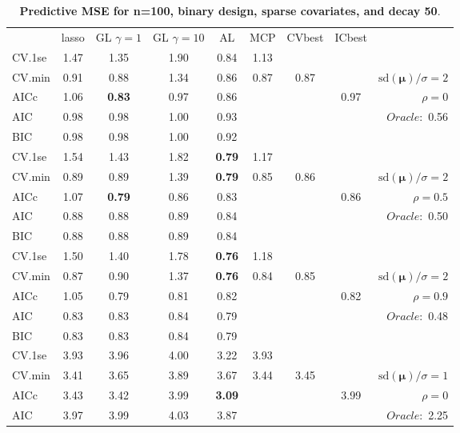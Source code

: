 \begin{table}\vspace{-.5cm}
\caption[l]{ { \bf Predictive MSE for n=100, binary design, 
sparse covariates, and  decay  50}.}
\vspace{-.5cm}
\footnotesize{}
\begin{center}
\begin{tabular}{l*{7}{c}|r}
 & lasso & GL $\gamma=1$ & GL $\gamma=10$ & AL & MCP  & CVbest & ICbest  \\
\cline{1-9}
CV.1se & 1.47 & 1.35 & 1.90 & 0.84 & 1.13 & & & \\
CV.min & 0.91 & 0.88 & 1.34 & 0.86 & 0.87 & 0.87 & & $\mathrm{sd}(\mathbf{\mu})/\sigma=2$ \\
AICc & 1.06 & {\bf 0.83} & 0.97 & 0.86 & & & 0.97 &  $\rho=0$ \\
AIC & 0.98 & 0.98 & 1.00 & 0.93 & & & &  \multirow{2}{*}{$Oracle: $ 0.56} \\
BIC & 0.98 & 0.98 & 1.00 & 0.92 & & & &  \\
 \hline 
CV.1se & 1.54 & 1.43 & 1.82 & {\bf 0.79} & 1.17 & & & \\
CV.min & 0.89 & 0.89 & 1.39 & {\bf 0.79} & 0.85 & 0.86 & & $\mathrm{sd}(\mathbf{\mu})/\sigma=2$ \\
AICc & 1.07 & {\bf 0.79} & 0.86 & 0.83 & & & 0.86 &  $\rho=0.5$ \\
AIC & 0.88 & 0.88 & 0.89 & 0.84 & & & &  \multirow{2}{*}{$Oracle: $ 0.50} \\
BIC & 0.88 & 0.88 & 0.89 & 0.84 & & & &  \\
 \hline 
CV.1se & 1.50 & 1.40 & 1.78 & {\bf 0.76} & 1.18 & & & \\
CV.min & 0.87 & 0.90 & 1.37 & {\bf 0.76} & 0.84 & 0.85 & & $\mathrm{sd}(\mathbf{\mu})/\sigma=2$ \\
AICc & 1.05 & 0.79 & 0.81 & 0.82 & & & 0.82 &  $\rho=0.9$ \\
AIC & 0.83 & 0.83 & 0.84 & 0.79 & & & &  \multirow{2}{*}{$Oracle: $ 0.48} \\
BIC & 0.83 & 0.83 & 0.84 & 0.79 & & & &  \\
 \hline 
CV.1se & 3.93 & 3.96 & 4.00 & 3.22 & 3.93 & & & \\
CV.min & 3.41 & 3.65 & 3.89 & 3.67 & 3.44 & 3.45 & & $\mathrm{sd}(\mathbf{\mu})/\sigma=1$ \\
AICc & 3.43 & 3.42 & 3.99 & {\bf 3.09} & & & 3.99 &  $\rho=0$ \\
AIC & 3.97 & 3.99 & 4.03 & 3.87 & & & &  \multirow{2}{*}{$Oracle: $ 2.25} \\

\end{tabular}
\end{center}
\end{table}
